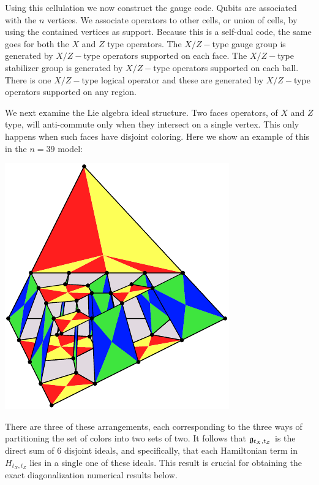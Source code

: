 Using this cellulation we now construct the gauge code.
Qubits are associated with the $n$ vertices.
We associate operators to other cells, or union of cells,
by using the contained vertices as support.
Because this is a self-dual code, the same goes for
both the $X$ and $Z$ type operators.
The $X/Z-$type gauge group is generated by
$X/Z-$type operators supported on each face.
The $X/Z-$type stabilizer group is generated by
$X/Z-$type operators supported on each ball.
There is one $X/Z-$type logical operator and these
are generated by
$X/Z-$type operators supported on any region.

We next examine the Lie algebra ideal structure.
Two faces operators, of $X$ and $Z$ type,
will anti-commute only when
they intersect on a single vertex.
This only happens when such faces have disjoint coloring.
Here we show an example of this in the $n=39$ model:
\begin{center}
\includegraphics{pic-gcolor-ideal.pdf}
\end{center}
There are three of these arrangements,
each corresponding to the three ways of
partitioning the set of colors into two sets of two.
It follows that $\mathfrak{g}_{t_X,t_Z}$ 
is the direct sum of 6 disjoint ideals,
and specifically, that each Hamiltonian term in $H_{t_X,t_Z}$
lies in a single one of these ideals.
This result is crucial for obtaining the exact
diagonalization numerical results below.


